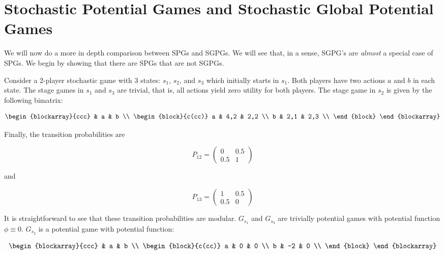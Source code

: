 \section{Stochastic Potential Games and Stochastic Global Potential Games}

We will now do a more in depth comparison between SPGs and SGPGs. We will see that, in a sense, SGPG's are {\em almost} a special case of SPGs. We begin by showing that there are SPGs that are not SGPGs. 

\begin{eg}
Consider a 2-player stochastic game with 3 states: $s_1$, $s_2$, and $s_3$ which initially starts in $s_1$. Both players have two actions $a$ and $b$ in each state. The stage games in $s_1$ and $s_3$ are trivial, that is, all actions yield zero utility for both players. The stage game in $s_2$ is given by the following bimatrix:



\[
\begin{blockarray}{ccc}
 & a & b \\
\begin{block}{c(cc)}
  a & 4,2 & 2,2 \\
  b & 2,1 & 2,3 \\
\end{block}
\end{blockarray}
 \]

Finally, the transition probabilities are

$$
P_{12} = 
\begin{pmatrix} 
0 & 0.5 \\
0.5 & 1 
\end{pmatrix}
$$

and

$$
P_{13} =
\begin{pmatrix} 
1 & 0.5 \\
0.5 & 0 
\end{pmatrix}
$$

It is straightforward to see that these transition probabilities are modular. $G_{s_1}$ and $G_{s_3}$ are trivially potential games with potential function $\phi \equiv 0$. $G_{s_2}$ is a potential game with potential function:

\[
\begin{blockarray}{ccc}
 & a & b \\
\begin{block}{c(cc)}
  a & 0 & 0 \\
  b & -2 & 0 \\
\end{block}
\end{blockarray}
 \]


\end{eg}
